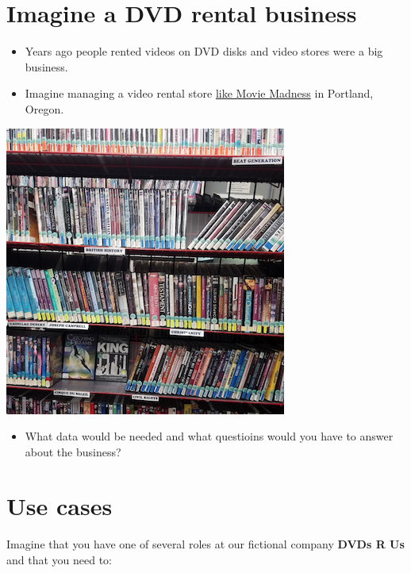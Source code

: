 \documentclass[]{book}
\providecommand{\tightlist}{%
  \setlength{\itemsep}{0pt}\setlength{\parskip}{0pt}}
\theoremstyle{definition}
\theoremstyle{definition}
\theoremstyle{definition}
\theoremstyle{remark}
\begin{document}
\hypertarget{imagine-a-dvd-rental-business}{%
\section{Imagine a DVD rental
business}\label{imagine-a-dvd-rental-business}}

\begin{itemize}
\tightlist
\item
  Years ago people rented videos on DVD disks and video stores were a
  big business.
\item
  Imagine managing a video rental store
  \href{https://en.wikipedia.org/wiki/Movie_Madness_Video}{like Movie
  Madness} in Portland, Oregon.
\end{itemize}

\begin{center}\includegraphics{screenshots/movie-madness-sample} \end{center}

\begin{itemize}
\tightlist
\item
  What data would be needed and what questioins would you have to answer
  about the business?
\end{itemize}

\hypertarget{use-cases}{%
\section{Use cases}\label{use-cases}}

Imagine that you have one of several roles at our fictional company
\textbf{DVDs R Us} and that you need to:
\end{document}
